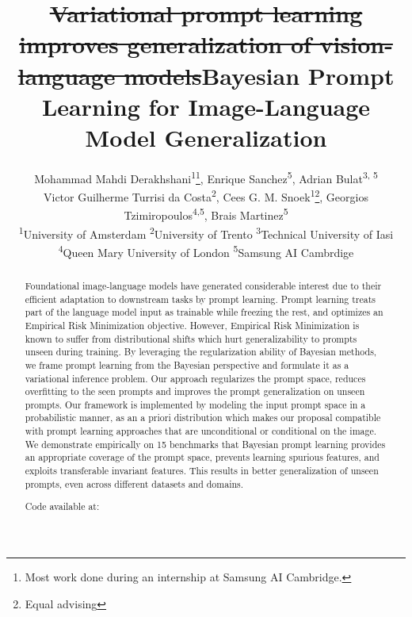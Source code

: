 \documentclass[10pt,twocolumn,letterpaper]{article}
\begin{document}
\title{\st{Variational prompt learning improves generalization of vision-language models}}
\title{Bayesian Prompt Learning for Image-Language Model Generalization}


\author{Mohammad Mahdi Derakhshani\textsuperscript{\rm 1}\thanks{Most work done during an internship at Samsung AI Cambridge. },  Enrique Sanchez\textsuperscript{\rm 5}, Adrian Bulat\textsuperscript{\rm 3, 5}\\ Victor Guilherme Turrisi da Costa\textsuperscript{\rm 2}\footnotemark[1], 
Cees G. M. Snoek\textsuperscript{\rm 1}\thanks{Equal advising}, Georgios Tzimiropoulos\textsuperscript{\rm 4,5}\footnotemark[2], Brais Martinez\textsuperscript{\rm 5}\footnotemark[2]\\
\textsuperscript{\rm 1}University of Amsterdam \hspace{2mm} \textsuperscript{\rm 2}University of Trento\hspace{2mm} 
\textsuperscript{\rm 3}Technical University of Iasi \\
\textsuperscript{\rm 4}Queen Mary University of London \hspace{2mm} 
\textsuperscript{\rm 5}Samsung AI Cambrdige\\
}




\maketitle
\ificcvfinal\thispagestyle{empty}\fi

\begin{abstract}
Foundational image-language models have generated considerable interest due to their efficient adaptation to downstream tasks by prompt learning. Prompt learning treats part of the language model input as trainable while freezing the rest, and optimizes an Empirical Risk Minimization objective. However, Empirical Risk Minimization is known to suffer from distributional shifts which hurt generalizability to prompts unseen during training. By leveraging the regularization ability of Bayesian methods, we frame prompt learning from the Bayesian perspective and formulate it as a variational inference problem. Our approach regularizes the prompt space, reduces overfitting to the seen prompts and improves the prompt generalization on unseen prompts. Our framework is implemented by modeling the input prompt space in a probabilistic manner, as an a priori distribution which makes our proposal compatible with prompt learning approaches that are unconditional or conditional on the image. We demonstrate empirically on 15 benchmarks that Bayesian prompt learning provides an appropriate coverage of the prompt space, prevents learning spurious features, and exploits transferable invariant features. This results in better generalization of unseen prompts, even across different datasets and domains.

Code available at: \color{barpurpule}{https://github.com/saic-fi/Bayesian-Prompt-Learning}
\end{abstract}
\end{document}
